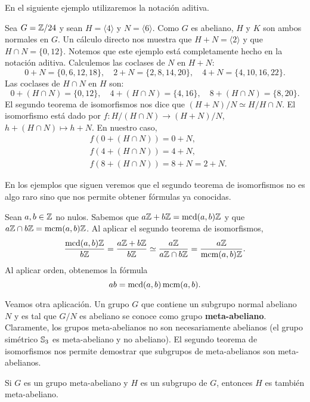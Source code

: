 En el siguiente ejemplo utilizaremos la notación aditiva. 

\begin{example}
Sea $G=\mathbb{Z}/24$ y sean $H=\langle 4\rangle$ y $N=\langle 6\rangle$. Como $G$ es abeliano, $H$ y $K$ son ambos normales en $G$. Un cálculo directo nos muestra que 
$H+N=\langle 2\rangle$ y que $H\cap N=\{0,12\}$. Notemos que este ejemplo está completamente hecho en la notación aditiva. Calculemos las coclases de $N$ en $H+N$:
\[
0+N=\{0,6,12,18\},
\quad
2+N=\{2,8,14,20\},
\quad
4+N=\{4,10,16,22\}.
\]
Las coclases de $H\cap N$ en $H$ son:
\[
0+(H\cap N)=\{0,12\},
\quad
4+(H\cap N)=\{4,16\},
\quad
8+(H\cap N)=\{8,20\}.
\]
El segundo teorema de isomorfismos nos dice que $(H+N)/N\simeq H/H\cap N$. El isomorfismo 
está dado por $f\colon H/(H\cap N)\to (H+N)/N$, $h+(H\cap N)\mapsto h+N$. 
En nuestro caso, 
\begin{align*}
&f(0+(H\cap N))=0+N,\\
&f(4+(H\cap N))=4+N,\\
&f(8+(H\cap N))=8+N=2+N.
\end{align*}
\end{example}

En los ejemplos que siguen veremos que el segundo teorema de isomorfismos no es algo raro sino que nos permite obtener fórmulas ya conocidas.

\begin{example}
Sean $a,b\in\mathbb{Z}$ no nulos. Sabemos que $a\mathbb{Z}+b\mathbb{Z}=\operatorname{mcd}(a,b)\mathbb{Z}$ y que $a\mathbb{Z}\cap b\mathbb{Z}=\operatorname{mcm}(a,b)\mathbb{Z}$. Al aplicar el segundo teorema de isomorfismos, 
\[
\frac{\operatorname{mcd}(a,b)\mathbb{Z}}{b\mathbb{Z}}=\frac{a\mathbb{Z}+b\mathbb{Z}}{b\mathbb{Z}}\simeq
\frac{a\mathbb{Z}}{a\mathbb{Z}\cap b\mathbb{Z}}=\frac{a\mathbb{Z}}{\operatorname{mcm}(a,b)\mathbb{Z}}.
\]
Al aplicar orden, obtenemos la fórmula 
\[
ab=\operatorname{mcd}(a,b)\operatorname{mcm}(a,b).
\] 
\end{example}

Veamos otra aplicación. Un grupo $G$ que contiene un subgrupo normal abeliano $N$ y es tal que $G/N$ es abeliano se conoce como grupo \textbf{meta-abeliano}. Claramente, los grupos meta-abelianos no son necesariamente abelianos (el grupo simétrico $\mathbb{S}_3$ es meta-abeliano y no abeliano). El segundo teorema de isomorfismos nos permite demostrar que subgrupos de meta-abelianos son meta-abelianos. 

\begin{proposition}
Si $G$ es un grupo meta-abeliano y $H$ es un subgrupo de $G$, entonces $H$ es también meta-abeliano. 
\end{proposition}

